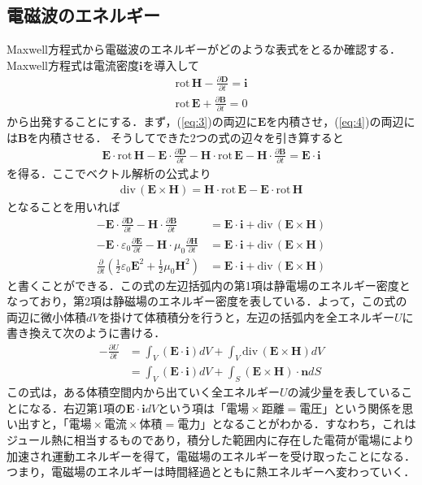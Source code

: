 \documentclass[a4j,10pt,oneside,openany]{jsbook}
\newcommand{\dive}{\mathrm{div}\,}  %
\newcommand{\rot}{\mathrm{rot}\,}  %
\newcommand{\vE}{\boldsymbol{E}}
\newcommand{\vB}{\boldsymbol{B}}
\newcommand{\vi}{\boldsymbol{i}}
\newcommand{\vH}{\boldsymbol{H}}
\newcommand{\vD}{\boldsymbol{D}}
\newcommand{\vn}{\boldsymbol{n}}
\newcommand{\del}{\partial}
\begin{document}
{\subsection{電磁波のエネルギー}
Maxwell方程式から電磁波のエネルギーがどのような表式をとるか確認する．Maxwell方程式は電流密度$\vi$を導入して
\begin{align}
  \rot\vH-\frac{\del \vD}{\del t}=\vi\label{eq:3}\\
  \rot\vE+\frac{\del \vB}{\del t}=0\label{eq:4}
\end{align}
から出発することにする．まず，(\ref{eq:3})の両辺に$\vE$を内積させ，(\ref{eq:4})の両辺には$\vB$を内積させる．
そうしてできた2つの式の辺々を引き算すると
\begin{align}
  \vE\cdot\rot\vH-\vE\cdot\frac{\del \vD}{\del t}-\vH\cdot\rot\vE-\vH\cdot\frac{\del \vB}{\del t}=\vE\cdot\vi
\end{align}
を得る．ここでベクトル解析の公式より
\begin{align}
  \dive(\vE\times\vH)=\vH\cdot\rot\vE-\vE\cdot\rot\vH\label{eq:divEH}
\end{align}
となることを用いれば
\begin{align}
  -\vE\cdot\frac{\del\vD}{\del t}-\vH\cdot\frac{\del\vB}{\del t}&=\vE\cdot\vi+\dive(\vE\times\vH)\nonumber\\
  -\vE\cdot\varepsilon_0\frac{\del\vE}{\del t}-\vH\cdot\mu_0\frac{\del \vH}{\del t}&=\vE\cdot\vi+\dive(\vE\times\vH)\nonumber\\
  \frac{\del}{\del t}\left(\frac{1}{2}\varepsilon_0\vE^2+\frac{1}{2}\mu_0\vH^2\right) &=\vE\cdot\vi+\dive(\vE\times\vH)
\end{align}
と書くことができる．この式の左辺括弧内の第1項は静電場のエネルギー密度となっており，第2項は静磁場のエネルギー密度を表している．よって，この式の両辺に微小体積$dV$を掛けて体積積分を行うと，左辺の括弧内を全エネルギー$U$に書き換えて次のように書ける．
\begin{align}
  -\frac{\del U}{\del t}&=\int_V (\vE\cdot\vi)dV+\int_V \dive(\vE\times\vH)dV\nonumber\\
  &=\int_V (\vE\cdot\vi)dV+\int_S (\vE\times\vH)\cdot\vn dS
\end{align}
この式は，ある体積空間内から出ていく全エネルギー$U$の減少量を表していることになる．右辺第1項の$\vE\cdot\vi dV$という項は「$\mbox{電場}\times\mbox{距離}=\mbox{電圧}$」という関係を思い出すと，「$\mbox{電場}\times\mbox{電流}\times\mbox{体積}=\mbox{電力}$」となることがわかる．すなわち，これはジュール熱に相当するものであり，積分した範囲内に存在した電荷が電場により加速され運動エネルギーを得て，電磁場のエネルギーを受け取ったことになる．つまり，電磁場のエネルギーは時間経過とともに熱エネルギーへ変わっていく．

}
\end{document}
